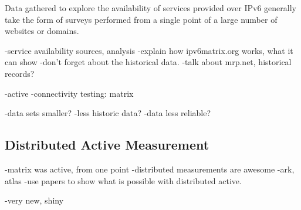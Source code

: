 Data gathered to explore the availability of services provided over IPv6
generally take the form of surveys performed from a single point of a large
number of websites or domains. 



-service availability sources, analysis
-explain how ipv6matrix.org works, what it can show
    -don't forget about the historical data.
-talk about mrp.net, historical records?

-active
-connectivity testing: matrix

-data sets smaller?
-less historic data?
-data less reliable?

\subsection{Distributed Active Measurement}

-matrix was active, from one point
-distributed measurements are awesome
-ark, atlas
-use papers to show what is possible with distributed active.

-very new, shiny

